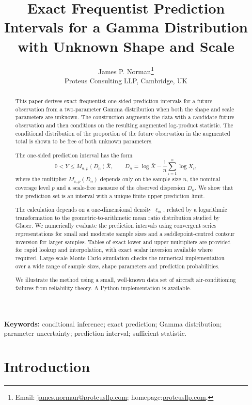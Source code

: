 \documentclass[11pt]{article}
\title{\bf Exact Frequentist Prediction Intervals for a Gamma Distribution\\[2pt]
with Unknown Shape and Scale}
\author{James P. Norman\thanks{Email: \href{mailto:james.norman@proteusllp.com}{james.norman@proteusllp.com}; homepage:\href{https://proteusllp.com}{proteusllp.com}.}\\Proteus Consulting LLP, Cambridge, UK}
\date{}
\theoremstyle{remark}
\begin{document}
\maketitle

\begin{abstract}
This paper derives exact frequentist one-sided prediction intervals for a future observation from a two-parameter Gamma 
distribution when both the shape and scale parameters are unknown. The construction augments the data with a candidate future observation and then conditions on the resulting augmented log-product statistic. 
The conditional distribution of the proportion of the future observation in the augmented total is shown to be free of both unknown parameters.

The one-sided prediction interval has the form
\[
 0<Y\le M_{n,p}(D_n)\bar X,
 \qquad
 D_n=\log\bar X-\frac1n\sum_{i=1}^n\log X_i,
\]
where the multiplier $M_{n,p}(D_n)$ depends only on the sample size $n$, the nominal coverage level $p$ and 
a scale-free measure of the observed dispersion $D_n$. 
We show that the prediction set is an interval with a unique finite upper prediction limit.

The calculation depends on a one-dimensional density $\ell_m$, related by a logarithmic transformation to the 
geometric-to-arithmetic mean ratio distribution studied by Glaser. We numerically evaluate the prediction intervals 
using convergent series representations for small and moderate sample sizes and a saddlepoint-centred contour inversion for larger samples. Tables of exact lower and upper multipliers are provided for rapid lookup and interpolation, with exact scalar inversion available where required.
Large-scale Monte Carlo simulation checks the numerical implementation over a wide range of sample sizes, shape parameters and prediction probabilities.

We illustrate the method using a small, well-known data set of aircraft air-conditioning failures from reliability theory. A Python implementation is available.
\end{abstract}

\noindent\textbf{Keywords:} conditional inference; exact prediction; Gamma distribution; parameter uncertainty; prediction interval; sufficient statistic.

\section{Introduction}
\end{document}

